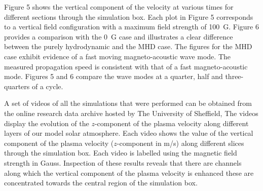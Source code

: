 \documentclass[physics,article,submit,pdftex,moreauthors]{Definitions/mdpi}
\begin{document}


 Figure 5 %
 shows the vertical component of the velocity at various times for different sections through the simulation box. Each plot in  Figure 5 %
 corresponds to a vertical field configuration with a maximum field strength of 100~G. Figure 6 provides a comparison with the 0~G case and %
 illustrates a clear difference between the purely hydrodynamic and the MHD case.  The figures for the MHD case exhibit evidence of a fast moving magneto-acoustic wave mode. The measured propagation speed is consistent with that of a fast magneto-acoustic mode. Figures 5 and 6 compare the wave modes at a quarter, half and three-quarters of a cycle. 

 A set of videos of all the simulations that were performed can be obtained from the online research data archive hosted by The University of Sheffield, \citet{Griffiths2018a} 
 The videos display the evolution of the $z$-component of the plasma velocity along different layers of our model solar atmosphere. Each video shows the value of the vertical component of the plasma velocity ($z$-component in m/s) along different slices through the simulation box. Each video is labelled using the magnetic field strength in Gauss. Inspection of these results reveals that there are channels along which the vertical component of the plasma velocity is enhanced these are concentrated towards the central region of the simulation box.
  
\end{document}
